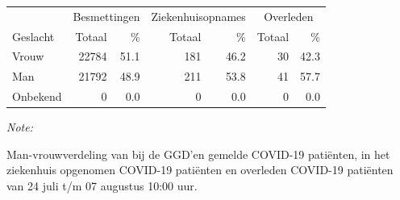 \documentclass[
  english,
  man,floatsintext]{apa6}
\begin{document}
\begin{table}
\centering\begingroup\fontsize{11}{13}\selectfont

\begin{threeparttable}
\begin{tabular}{lrrrrrr}
\toprule
\multicolumn{1}{c}{ } & \multicolumn{2}{c}{Besmettingen} & \multicolumn{2}{c}{Ziekenhuisopnames} & \multicolumn{2}{c}{Overleden} \\
\cmidrule(l{3pt}r{3pt}){2-3} \cmidrule(l{3pt}r{3pt}){4-5} \cmidrule(l{3pt}r{3pt}){6-7}
Geslacht & Totaal & \% & Totaal & \% & Totaal & \%\\
\midrule
Vrouw & 22784 & 51.1 & 181 & 46.2 & 30 & 42.3\\
Man & 21792 & 48.9 & 211 & 53.8 & 41 & 57.7\\
Onbekend & 0 & 0.0 & 0 & 0.0 & 0 & 0.0\\
\bottomrule
\end{tabular}
\begin{tablenotes}
\item \textit{Note: } 
\item Man-vrouwverdeling van bij de GGD’en gemelde COVID-19 patiënten, in het ziekenhuis opgenomen COVID-19 patiënten en overleden COVID-19 patiënten van 24 juli t/m 07 augustus 10:00 uur.
\end{tablenotes}
\end{threeparttable}
\endgroup{}
\end{table}
\newpage
\end{document}
